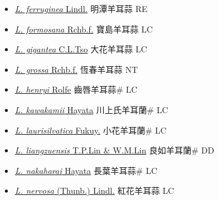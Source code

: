 \begin{itemize}
\begin{itemize}
        \item[] \href{http://www.theplantlist.org/tpl1.1/search?q=Liparis+ferruginea}{\textit{L. ferruginea} Lindl.}     明潭羊耳蒜 RE
        \item[] \href{http://www.theplantlist.org/tpl1.1/search?q=Liparis+formosana}{\textit{L. formosana} Rchb.f.}   寶島羊耳蒜 LC
        \item[] \href{http://www.theplantlist.org/tpl1.1/search?q=Liparis+gigantea}{\textit{L. gigantea} C.L.Tso}     大花羊耳蒜 LC
        \item[] \href{http://www.theplantlist.org/tpl1.1/search?q=Liparis+grossa}{\textit{L. grossa} Rchb.f.}   恆春羊耳蒜 NT
        \item[] \href{http://www.theplantlist.org/tpl1.1/search?q=Liparis+henryi}{\textit{L. henryi} Rolfe}   齒唇羊耳蒜\# LC
        \item[] \href{http://www.theplantlist.org/tpl1.1/search?q=Liparis+kawakamii}{\textit{L. kawakamii} Hayata}   川上氏羊耳蘭\# LC
        \item[] \href{http://www.theplantlist.org/tpl1.1/search?q=Liparis+laurisilvatica}{\textit{L. laurisilvatica} Fukuy.}   小花羊耳蘭\# LC
        \item[] \href{http://www.theplantlist.org/tpl1.1/search?q=Liparis+liangzuensis}{\textit{L. liangzuensis} T.P.Lin \& W.M.Lin}   良如羊耳蘭\# DD
        \item[] \href{http://www.theplantlist.org/tpl1.1/search?q=Liparis+nakaharai}{\textit{L. nakaharai} Hayata}   長葉羊耳蒜\# LC
        \item[] \href{http://www.theplantlist.org/tpl1.1/search?q=Liparis+nervosa}{\textit{L. nervosa} (Thunb.) Lindl.}   紅花羊耳蒜 LC

\end{itemize}
\end{itemize}
